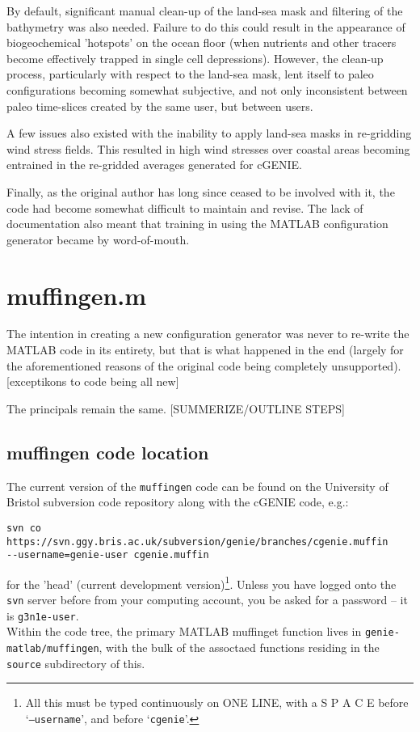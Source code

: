 \documentclass[11pt,fleqn]{book} %
\begin{document}
By default, significant manual clean-up of the land-sea mask and filtering of the bathymetry was also needed. Failure to do this could result in the appearance of biogeochemical 'hotspots' on the ocean floor (when nutrients and other tracers become effectively trapped in single cell depressions). However, the clean-up process, particularly with respect to the land-sea mask, lent itself to paleo configurations becoming somewhat subjective, and not only inconsistent between paleo time-slices created by the same user, but between users.

A few issues also existed with the inability to apply land-sea masks in re-gridding wind stress fields. This resulted in high wind stresses over coastal areas becoming entrained in the re-gridded averages generated for cGENIE.

Finally, as the original author has long since ceased to be involved with it, the code had become somewhat difficult to maintain and revise. The lack of documentation also meant that training in using the MATLAB configuration generator became by word-of-mouth.


\section{muffingen.m}

The intention in creating a new configuration generator was never to re-write the MATLAB code in its entirety, but that is what happened in the end (largely for the aforementioned reasons of the original code being completely unsupported). [exceptikons to code being all new]

The principals remain the same. [SUMMERIZE/OUTLINE STEPS]



\subsection{muffingen code location}

The current version of the \texttt{muffingen} code can be found on the University of Bristol subversion code repository along with the cGENIE code, e.g.:
\vspace{-5pt}\begin{verbatim}
svn co https://svn.ggy.bris.ac.uk/subversion/genie/branches/cgenie.muffin
--username=genie-user cgenie.muffin
\end{verbatim}\vspace{-5pt}
for the 'head' (current development version)\footnote{All this must be typed continuously on ONE LINE, with a S P A C E before `\texttt{--username}', and before `\texttt{cgenie}'.}.
Unless you have logged onto the \texttt{svn} server before from your computing account, you be asked for a password -- it is \texttt{g3n1e-user}.
\\Within the code tree, the primary MATLAB muffinget function lives in \texttt{genie-matlab/muffingen}, with the bulk of the assoctaed functions residing in the \texttt{source} subdirectory of this. 
\end{document}
